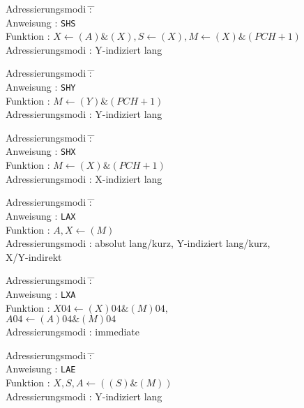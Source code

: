 \documentclass[12pt,a4paper,twoside]{report}
\newcommand{\tty}[1]{{\tt #1}}
\begin{document}
\begin{tabbing}
Adressierungsmodi \= : \= \kill \\
Anweisung         \> : \> \tty{SHS} \\
Funktion          \> : \> $X\leftarrow(A)\&(X), S\leftarrow(X), M\leftarrow(X)\&(PCH+1)$ \\
Adressierungsmodi \> : \> Y-indiziert lang \\
\end{tabbing}
\begin{tabbing}
Adressierungsmodi \= : \= \kill \\
Anweisung         \> : \> \tty{SHY} \\
Funktion          \> : \> $M\leftarrow(Y)\&(PCH+1)$ \\
Adressierungsmodi \> : \> Y-indiziert lang \\
\end{tabbing}
\begin{tabbing}
Adressierungsmodi \= : \= \kill \\
Anweisung         \> : \> \tty{SHX} \\
Funktion          \> : \> $M\leftarrow(X)\&(PCH+1)$ \\
Adressierungsmodi \> : \> X-indiziert lang \\
\end{tabbing}
\begin{tabbing}
Adressierungsmodi \= : \= \kill \\
Anweisung         \> : \> \tty{LAX} \\
Funktion          \> : \> $A,X\leftarrow(M)$ \\
Adressierungsmodi \> : \> absolut lang/kurz, Y-indiziert lang/kurz, \\
                  \>   \> X/Y-indirekt \\
\end{tabbing}
\begin{tabbing}
Adressierungsmodi \= : \= \kill \\
Anweisung         \> : \> \tty{LXA} \\
Funktion          \> : \> $X{04}\leftarrow(X){04} \& (M){04},$ \\
                  \>   \> $A{04}\leftarrow(A){04} \& (M){04}$ \\
Adressierungsmodi \> : \> immediate \\
\end{tabbing}
\begin{tabbing}
Adressierungsmodi \= : \= \kill \\
Anweisung         \> : \> \tty{LAE} \\
Funktion          \> : \> $X,S,A\leftarrow((S)\&(M))$ \\
Adressierungsmodi \> : \> Y-indiziert lang \\
\end{tabbing}
\end{document}
